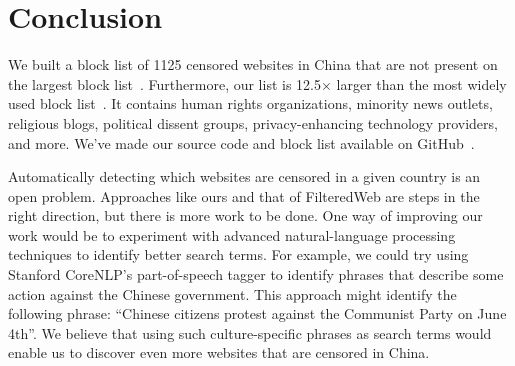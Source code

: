 
\section{Conclusion}
We built a block list of 1125 censored websites in China that are not
present on the largest block
list~\cite{darer2017filteredweb}. Furthermore, our list is
12.5$\times$ larger than the most widely used block
list~\cite{citizenlab:block}. It contains human rights organizations,
minority news outlets, religious blogs, political dissent groups,
privacy-enhancing technology providers, and more. We've made our
source code and block list available on
GitHub~\cite{censorsearch-lists}.

Automatically detecting which websites are censored in a given country
is an open problem. Approaches like ours and that of FilteredWeb are
steps in the right direction, but there is more work to be done.  One
way of improving our work would be to experiment with advanced
natural-language processing techniques to identify better search
terms. For example, we could try using Stanford CoreNLP's
part-of-speech tagger to identify phrases that describe some action
against the Chinese government. This approach might identify the
following phrase: ``Chinese citizens protest against the Communist
Party on June 4th''. We believe that using such culture-specific
phrases as search terms would enable us to discover even more websites
that are censored in China.
